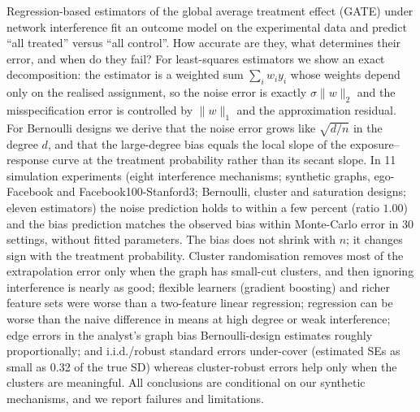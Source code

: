 Regression-based estimators of the global average treatment effect (GATE) under network interference fit an outcome model on the experimental data and predict ``all treated'' versus ``all control''. How accurate are they, what determines their error, and when do they fail? For least-squares estimators we show an exact decomposition: the estimator is a weighted sum $\sum_i w_iy_i$ whose weights depend only on the realised assignment, so the noise error is exactly $\sigma\|w\|_2$ and the misspecification error is controlled by $\|w\|_1$ and the approximation residual. For Bernoulli designs we derive that the noise error grows like $\sqrt{d/n}$ in the degree $d$, and that the large-degree bias equals the local slope of the exposure--response curve at the treatment probability rather than its secant slope. In 11 simulation experiments (eight interference mechanisms; synthetic graphs, ego-Facebook and Facebook100-Stanford3; Bernoulli, cluster and saturation designs; eleven estimators) the noise prediction holds to within a few percent (ratio $1.00$) and the bias prediction matches the observed bias within Monte-Carlo error in 30 settings, without fitted parameters. The bias does not shrink with $n$; it changes sign with the treatment probability. Cluster randomisation removes most of the extrapolation error only when the graph has small-cut clusters, and then ignoring interference is nearly as good; flexible learners (gradient boosting) and richer feature sets were worse than a two-feature linear regression; regression can be worse than the naive difference in means at high degree or weak interference; edge errors in the analyst's graph bias Bernoulli-design estimates roughly proportionally; and i.i.d./robust standard errors under-cover (estimated SEs as small as 0.32 of the true SD) whereas cluster-robust errors help only when the clusters are meaningful. All conclusions are conditional on our synthetic mechanisms, and we report failures and limitations.
